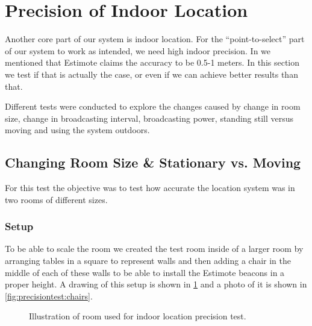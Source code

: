 \section{Precision of Indoor Location}\label{sec:estimoteprecision}
Another core part of our system is indoor location. 
For the ``point-to-select'' part of our system to work as intended, we need high indoor precision. 
In  we mentioned that Estimote claims the accuracy to be \num{0.5}-\num{1} meters.
In this section we test if that is actually the case, or even if we can achieve better results than that. 

Different tests were conducted to explore the changes caused by change in room size, change in broadcasting interval, broadcasting power, standing still versus moving and using the system outdoors.

\subsection{Changing Room Size & Stationary vs. Moving}
For this test the objective was to test how accurate the location system was in two rooms of different sizes.

\subsubsection*{Setup}
To be able to scale the room we created the test room inside of a larger room by arranging tables in a square to represent walls and then adding a chair in the middle of each of these walls to be able to install the Estimote beacons in a proper height.
A drawing of this setup is shown in \cref{fig:precisiontest:illustration} and a photo of it is shown in \cref{fig:precisiontest:chairs}.

\begin{figure}[!htb]
    \centering
    \caption{Illustration of room used for indoor location precision test.}
\label{fig:precisiontest:illustration}
\end{figure}

